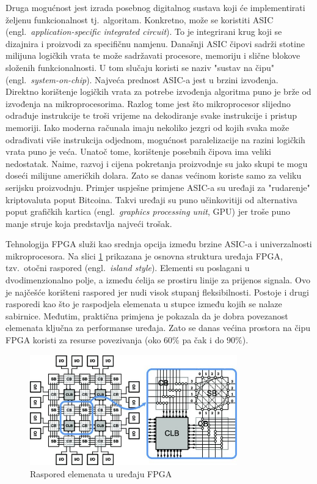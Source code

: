 \documentclass[times, utf8, diplomski]{fer}
\begin{document}
Druga mogućnost jest izrada posebnog digitalnog sustava koji će implementirati željenu funkcionalnost tj.~algoritam. Konkretno, može se koristiti ASIC (engl.~\textit{application-specific integrated circuit}). To je integrirani krug koji se dizajnira i proizvodi za specifičnu namjenu. Današnji ASIC čipovi sadrži stotine milijuna logičkih vrata te može sadržavati procesore, memoriju i slične blokove složenih funkcionalnosti. U tom slučaju koristi se naziv "sustav na čipu" (engl.~\textit{system-on-chip}). Najveća prednost ASIC-a jest u brzini izvođenja. Direktno korištenje logičkih vrata za potrebe izvođenja algoritma puno je brže od izvođenja na mikroprocesorima. Razlog tome jest što mikroprocesor slijedno odrađuje instrukcije te troši vrijeme na dekodiranje svake instrukcije i pristup memoriji. Iako moderna računala imaju nekoliko jezgri od kojih svaka može odrađivati više instrukcija odjednom, mogućnost paralelizacije na razini logičkih vrata puno je veća. Unatoč tome, korištenje posebnih čipova ima veliki nedostatak. Naime, razvoj i cijena pokretanja proizvodnje su jako skupi te mogu doseći milijune američkih dolara. Zato se danas većinom koriste samo za veliku serijsku proizvodnju. Primjer uspješne primjene ASIC-a su uređaji za "rudarenje" kriptovaluta poput Bitcoina. Takvi uređaji su puno učinkovitiji od alternativa poput grafičkih kartica (engl.~\textit{graphics processing unit}, GPU) jer troše puno manje struje koja predstavlja najveći trošak.

Tehnologija FPGA služi kao srednja opcija između brzine ASIC-a i univerzalnosti mikroprocesora. Na slici \ref{fig:fpga_island} prikazana je osnovna struktura uređaja FPGA, tzv.~otočni raspored (engl.~\textit{island style}). Elementi su poslagani u dvodimenzionalno polje, a između ćelija se prostiru linije za prijenos signala. Ovo je najčešće korišteni raspored jer nudi visok stupanj fleksibilnosti. Postoje i drugi rasporedi kao što je raspodjela elemenata u stupce između kojih se nalaze sabirnice. Međutim, praktična primjena je pokazala da je dobra povezanost elemenata ključna za performanse uređaja. Zato se danas većina prostora na čipu FPGA koristi za resurse povezivanja (oko $60\%$ pa čak i do $90\%$).

\begin{figure}[htb]
	\centering
	\includegraphics[width=0.8\textwidth]{img/fpga_island_notext.jpg}
	\caption{Raspored elemenata u uređaju FPGA}
	\label{fig:fpga_island}
\end{figure}
\end{document}
